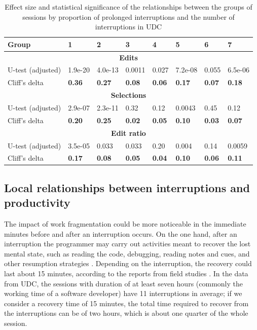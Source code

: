 \begin{table}[ht!]
	\small

	\caption{Effect size and statistical significance of the relationships between the groups of sessions by proportion of prolonged interruptions and the number of interruptions in UDC}
	\label{tbl:effect_size_dur_udc}
	\centering
	\begin{tabular}{l | p{1cm} | p{1cm} | p{1cm} | p{1cm} | p{1cm} | p{1cm} | p{1cm}} 
		\hline
		Group & 1 & 2 & 3 & 4 & 5 & 6 & 7  \\  
		\hline
		\hline
		\multicolumn{8}{c}{\textbf{Edits}} \\
		\hline
		U-test (adjusted) & 1.9e-20 & 4.0e-13 & 0.0011 & 0.027 & 7.2e-08 & 0.055 & 6.5e-06\\
		\hline
		Cliff's delta & \textbf{0.36} & \textbf{0.27} & \textbf{0.08} & \textbf{0.06} & \textbf{0.17} & \textbf{0.07} & \textbf{0.18} \\
		\hline
		
		\multicolumn{8}{c}{\textbf{Selections}} \\
		\hline 
		U-test (adjusted) & 2.9e-07 & 2.3e-11 & 0.32 & 0.12 & 0.0043 & 0.45 & 0.12 \\
		\hline
		Cliff's delta & \textbf{0.20} & \textbf{0.25} & \textbf{0.02} & \textbf{0.05} & \textbf{0.10} & \textbf{0.03} & \textbf{0.07} \\  
		\hline
		
		\multicolumn{8}{c}{\textbf{Edit ratio}} \\
		\hline 
		U-test (adjusted) & 3.5e-05 & 0.033 & 0.033 & 0.20 & 0.004 & 0.14 & 0.0059 \\
		\hline 
		Cliff's delta & \textbf{0.17} & \textbf{0.08} & \textbf{0.05} & \textbf{0.04} & \textbf{0.10} & \textbf{0.06} & \textbf{0.11}  \\
		\hline
		
	\end{tabular}
\end{table}

\subsection{Local relationships between interruptions and productivity}
The impact of work fragmentation could be more noticeable in the immediate minutes before and after an interruption occurs. On the one hand, after an interruption the programmer may carry out activities meant to recover the lost mental state, such as reading the code, debugging, reading notes and cues, and other resumption strategies \cite{PR11}. Depending on the interruption, the recovery could last about 15 minutes, according to the reports from field studies \cite{IH07, SBV98}. In the data from UDC, the sessions with duration of at least seven hours (commonly the working time of a software developer) have 11 interruptions in average; if we consider a recovery time of 15 minutes, the total time required to recover from the interruptions can be of two hours, which is about one quarter of the whole session.

